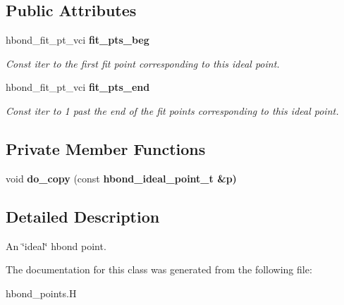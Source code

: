 \subsection*{Public Attributes}
\begin{CompactItemize}
\item 
hbond\_\-fit\_\-pt\_\-vci \bf{fit\_\-pts\_\-beg}\label{classSimSite3D_1_1hbond__ideal__point__t_620a62e5bfaeb61bc5815745a60aed5c}

\begin{CompactList}\small\item\em Const iter to the first fit point corresponding to this ideal point. \item\end{CompactList}\item 
hbond\_\-fit\_\-pt\_\-vci \bf{fit\_\-pts\_\-end}\label{classSimSite3D_1_1hbond__ideal__point__t_fd82444a9d7addc28b06b24e9b9badee}

\begin{CompactList}\small\item\em Const iter to 1 past the end of the fit points corresponding to this ideal point. \item\end{CompactList}\end{CompactItemize}
\subsection*{Private Member Functions}
\begin{CompactItemize}
\item 
void \textbf{do\_\-copy} (const \bf{hbond\_\-ideal\_\-point\_\-t} \&p)\label{classSimSite3D_1_1hbond__ideal__point__t_7cc7e353e9bce5777ffdf83cda34778b}

\end{CompactItemize}


\subsection{Detailed Description}
An \char`\"{}ideal\char`\"{} hbond point. 



The documentation for this class was generated from the following file:\begin{CompactItemize}
\item 
hbond\_\-points.H\end{CompactItemize}
